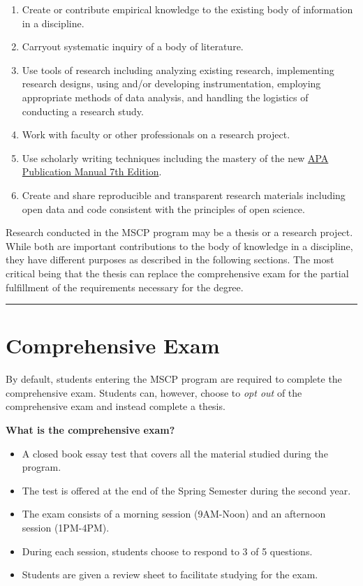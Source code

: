\documentclass[openany]{book}
\providecommand{\tightlist}{%
  \setlength{\itemsep}{0pt}\setlength{\parskip}{0pt}}
\begin{document}
\begin{enumerate}
\def\labelenumi{\arabic{enumi}.}
\tightlist
\item
  Create or contribute empirical knowledge to the existing body of information in a discipline.
\item
  Carryout systematic inquiry of a body of literature.
\item
  Use tools of research including analyzing existing research, implementing research designs, using and/or developing instrumentation, employing appropriate methods of data analysis, and handling the logistics of conducting a research study.
\item
  Work with faculty or other professionals on a research project.
\item
  Use scholarly writing techniques including the mastery of the new \href{https://apastyle.apa.org/products/publication-manual-7th-edition/}{APA Publication Manual 7th Edition}.
\item
  Create and share reproducible and transparent research materials including open data and code consistent with the principles of open science.
\end{enumerate}

Research conducted in the MSCP program may be a thesis or a research project. While both are important contributions to the body of knowledge in a discipline, they have different purposes as described in the following sections. The most critical being that the thesis can replace the comprehensive exam for the partial fulfillment of the requirements necessary for the degree.

\begin{center}\rule{0.5\linewidth}{0.5pt}\end{center}

\hypertarget{comprehensive-exam}{%
\section{Comprehensive Exam}\label{comprehensive-exam}}

By default, students entering the MSCP program are required to complete the comprehensive exam. Students can, however, choose to \emph{opt out} of the comprehensive exam and instead complete a thesis.

\textbf{What is the comprehensive exam?}

\begin{itemize}
\tightlist
\item
  A closed book essay test that covers all the material studied during the program.\\
\item
  The test is offered at the end of the Spring Semester during the second year.
\item
  The exam consists of a morning session (9AM-Noon) and an afternoon session (1PM-4PM).
\item
  During each session, students choose to respond to 3 of 5 questions.
\item
  Students are given a review sheet to facilitate studying for the exam.
\end{itemize}
\end{document}
